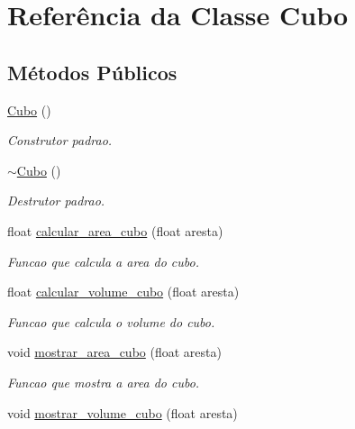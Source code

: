 \hypertarget{classCubo}{}\section{Referência da Classe Cubo}
\label{classCubo}
\subsection*{Métodos Públicos}
\begin{DoxyCompactItemize}
\item 
\mbox{\label{classCubo_a31c5cc16f929ef0161cd87b9cec1dd67}} 
\hyperlink{classCubo_a31c5cc16f929ef0161cd87b9cec1dd67}{Cubo} ()
\begin{DoxyCompactList}\small\item\em Construtor padrao. \end{DoxyCompactList}\item 
\mbox{\label{classCubo_ada9f424711b825757aaf553f82949522}} 
\hyperlink{classCubo_ada9f424711b825757aaf553f82949522}{$\sim$\+Cubo} ()
\begin{DoxyCompactList}\small\item\em Destrutor padrao. \end{DoxyCompactList}\item 
float \hyperlink{classCubo_a04d86d86766dd5c61b52ab23c46a18c4}{calcular\+\_\+area\+\_\+cubo} (float aresta)
\begin{DoxyCompactList}\small\item\em Funcao que calcula a area do cubo. \end{DoxyCompactList}\item 
float \hyperlink{classCubo_a7e0a0c1a63424349413783489e7be646}{calcular\+\_\+volume\+\_\+cubo} (float aresta)
\begin{DoxyCompactList}\small\item\em Funcao que calcula o volume do cubo. \end{DoxyCompactList}\item 
void \hyperlink{classCubo_aa0ad5a8f1b59b7f3265ef135a00c2c4e}{mostrar\+\_\+area\+\_\+cubo} (float aresta)
\begin{DoxyCompactList}\small\item\em Funcao que mostra a area do cubo. \end{DoxyCompactList}\item 
void \hyperlink{classCubo_aed70c98ac76c35e48c4f2767afc39d89}{mostrar\+\_\+volume\+\_\+cubo} (float aresta)

\end{DoxyCompactItemize}
